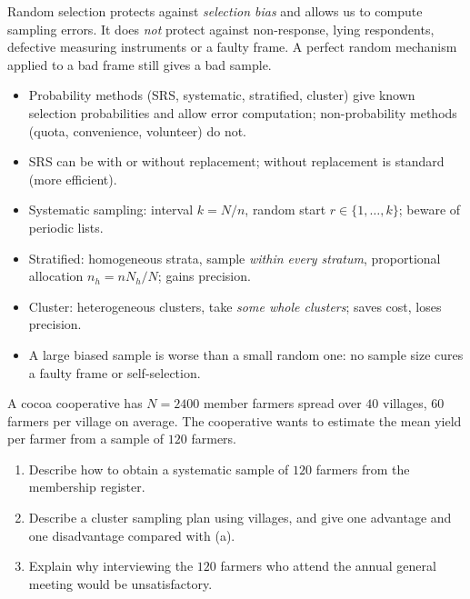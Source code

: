\documentclass[11pt]{article}
\begin{document}
\begin{attention}
Random selection protects against \emph{selection bias} and allows us to compute sampling errors. It does \emph{not} protect against non-response, lying respondents, defective measuring instruments or a faulty frame. A perfect random mechanism applied to a bad frame still gives a bad sample.
\end{attention}

\begin{aretenir}
\begin{itemize}
\item Probability methods (SRS, systematic, stratified, cluster) give known selection probabilities and allow error computation; non-probability methods (quota, convenience, volunteer) do not.
\item SRS can be with or without replacement; without replacement is standard (more efficient).
\item Systematic sampling: interval $k = N/n$, random start $r \in \{1,\dots,k\}$; beware of periodic lists.
\item Stratified: homogeneous strata, sample \emph{within every stratum}, proportional allocation $n_h = nN_h/N$; gains precision.
\item Cluster: heterogeneous clusters, take \emph{some whole clusters}; saves cost, loses precision.
\item A large biased sample is worse than a small random one: no sample size cures a faulty frame or self-selection.
\end{itemize}
\end{aretenir}

\begin{exercice}
A cocoa cooperative has $N = 2400$ member farmers spread over $40$ villages, $60$ farmers per village on average. The cooperative wants to estimate the mean yield per farmer from a sample of $120$ farmers.
\begin{enumerate}
\item Describe how to obtain a systematic sample of $120$ farmers from the membership register.
\item Describe a cluster sampling plan using villages, and give one advantage and one disadvantage compared with (a).
\item Explain why interviewing the $120$ farmers who attend the annual general meeting would be unsatisfactory.
\end{enumerate}
\end{exercice}
\end{document}
